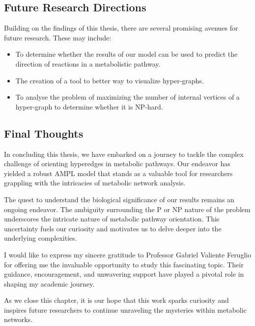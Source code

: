 \subsection{Future Research Directions}
Building on the findings of this thesis, there are several promising avenues for future research. These may include:

\begin{itemize}
    \item To determine whether the results of our model can be used to predict the direction of reactions in a metabolistic pathway.
    \item The creation of a tool to better way to visualize hyper-graphs.
    \item To analyse the problem of maximizing the number of internal vertices of a hyper-graph to determine whether it is NP-hard.
\end{itemize}

\subsection{Final Thoughts}

In concluding this thesis, we have embarked on a journey to tackle the complex challenge of orienting hyperedges in metabolic pathways. 
Our endeavor has yielded a robust AMPL model that stands as a valuable tool for researchers grappling with the intricacies of metabolic network analysis.

The quest to understand the biological significance of our results remains an ongoing endeavor. The ambiguity surrounding the P or NP nature of the problem underscores the intricate nature of metabolic pathway orientation. This uncertainty fuels our curiosity and motivates us to delve deeper into the underlying complexities.

I would like to express my sincere gratitude to Professor Gabriel Valiente Feruglio for offering me the invaluable opportunity to study this fascinating topic. Their guidance, encouragement, and unwavering support have played a pivotal role in shaping my academic journey.

As we close this chapter, it is our hope that this work sparks curiosity and inspires future researchers to continue unraveling the mysteries within metabolic networks.





